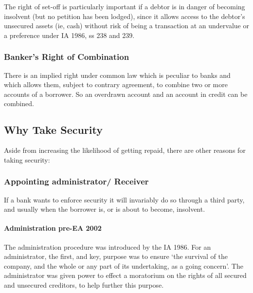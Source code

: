 \documentclass[
]{article}
\newenvironment{Shaded}{}{}
\newcommand{\NormalTok}[1]{#1}
\begin{document}
\begin{Shaded}
\begin{Highlighting}[]
\NormalTok{The right of set{-}off is particularly important if a debtor is in danger of becoming insolvent (but no petition has been lodged), since it allows access to the debtor’s unsecured assets (ie, cash) without risk of being a transaction at an undervalue or a preference under IA 1986, ss 238 and 239.}
\end{Highlighting}
\end{Shaded}

\hypertarget{bankers-right-of-combination}{%
\subsubsection{Banker's Right of
Combination}\label{bankers-right-of-combination}}

There is an implied right under common law which is peculiar to banks
and which allows them, subject to contrary agreement, to combine two or
more accounts of a borrower. So an overdrawn account and an account in
credit can be combined.

\hypertarget{why-take-security}{%
\subsection{Why Take Security}\label{why-take-security}}

Aside from increasing the likelihood of getting repaid, there are other
reasons for taking security:

\hypertarget{appointing-administrator-receiver}{%
\subsubsection{Appointing administrator/
Receiver}\label{appointing-administrator-receiver}}

If a bank wants to enforce security it will invariably do so through a
third party, and usually when the borrower is, or is about to become,
insolvent.

\hypertarget{administration-pre-ea-2002}{%
\paragraph{Administration pre-EA
2002}\label{administration-pre-ea-2002}}

The administration procedure was introduced by the IA 1986. For an
administrator, the first, and key, purpose was to ensure `the survival
of the company, and the whole or any part of its undertaking, as a going
concern'. The administrator was given power to effect a moratorium on
the rights of all secured and unsecured creditors, to help further this
purpose.
\end{document}
